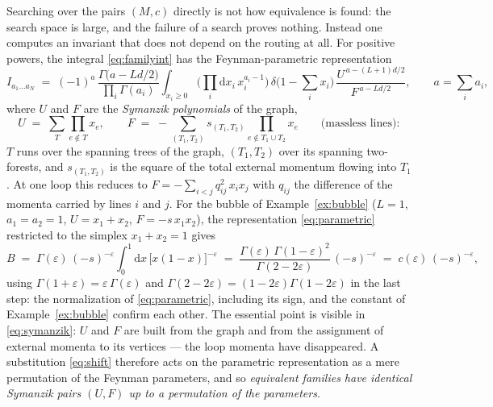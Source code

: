 \documentclass[11pt]{article}
\newcommand{\eps}{\varepsilon}
\newcommand{\dd}{\mathrm{d}}
\begin{document}
Searching over the pairs $(M, c)$ directly is not how equivalence is
found: the search space is large, and the failure of a search proves
nothing.  Instead one computes an invariant that does not depend on
the routing at all.  For positive powers, the integral
\eqref{eq:familyint} has the Feynman-parametric representation
\begin{equation}
  I_{a_1\dots a_N}
  \;=\; (-1)^{a}\,
  \frac{\Gamma\!\big(a - L d/2\big)}{\prod_i \Gamma(a_i)}
  \int_{x_i \ge 0} \Big(\prod_i \dd x_i\, x_i^{a_i-1}\Big)\,
  \delta\Big(1 - \sum_i x_i\Big)\,
  \frac{U^{\,a-(L+1)d/2}}{F^{\,a-Ld/2}} ,
  \qquad a = \sum_i a_i ,
  \label{eq:parametric}
\end{equation}
where $U$ and $F$ are the \emph{Symanzik polynomials} of the graph,
\begin{equation}
  U \;=\; \sum_{T} \prod_{e \notin T} x_e ,
  \qquad
  F \;=\; -\sum_{(T_1,T_2)} s_{(T_1,T_2)}
  \prod_{e \notin T_1 \cup T_2} x_e
  \qquad \text{(massless lines)} :
  \label{eq:symanzik}
\end{equation}
$T$ runs over the spanning trees of the graph, $(T_1,T_2)$ over its
spanning two-forests, and $s_{(T_1,T_2)}$ is the square of the total
external momentum flowing into $T_1$.  At one loop this reduces to
$F = -\sum_{i<j} q_{ij}^2\, x_i x_j$ with $q_{ij}$ the difference of
the momenta carried by lines $i$ and $j$.  For the bubble of
Example~\ref{ex:bubble} ($L = 1$, $a_1 = a_2 = 1$, $U = x_1 + x_2$,
$F = -s\,x_1x_2$), the representation \eqref{eq:parametric} restricted
to the simplex $x_1 + x_2 = 1$ gives
\begin{equation}
  B \;=\; \Gamma(\eps)\,(-s)^{-\eps}
  \int_0^1 \dd x\,\big[x(1-x)\big]^{-\eps}
  \;=\; \frac{\Gamma(\eps)\,\Gamma(1-\eps)^2}{\Gamma(2-2\eps)}\,
  (-s)^{-\eps} \;=\; c(\eps)\,(-s)^{-\eps} ,
  \label{eq:bubbleparametric}
\end{equation}
using $\Gamma(1+\eps) = \eps\,\Gamma(\eps)$ and
$\Gamma(2-2\eps) = (1-2\eps)\Gamma(1-2\eps)$ in the last step: the
normalization of \eqref{eq:parametric}, including its sign, and the
constant of Example~\ref{ex:bubble} confirm each other.  The essential
point is
visible in \eqref{eq:symanzik}: $U$ and $F$ are built from the graph
and from the assignment of external momenta to its vertices --- the
loop momenta have disappeared.  A substitution \eqref{eq:shift}
therefore acts on the parametric representation as a mere
permutation of the Feynman parameters, and so
\emph{equivalent families have identical Symanzik pairs $(U,F)$ up
to a permutation of the parameters}.
\end{document}

